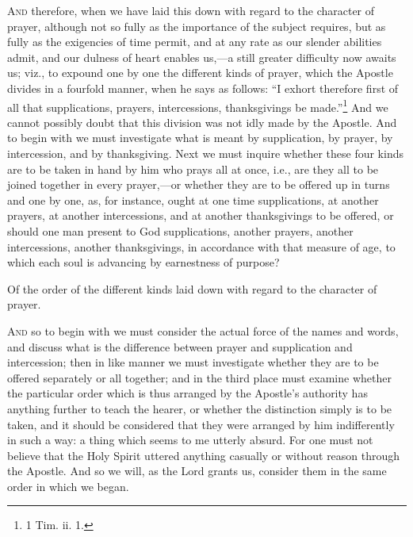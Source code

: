 \textsc{And} therefore, when we have laid this down with regard to the character of prayer, although not so fully as the importance of the subject requires, but as fully as the exigencies of time permit, and at any rate as our slender abilities admit, and our dulness of heart enables us,—a still greater difficulty now awaits us; viz., to expound one by one the different kinds of prayer, which the Apostle divides in a fourfold manner, when he says as follows: “I exhort therefore first of all that supplications, prayers, intercessions, thanksgivings be made.”\footnote{1 Tim. ii. 1.} And we cannot possibly doubt that this division was not idly made by the Apostle. And to begin with we must investigate what is meant by supplication, by prayer, by intercession, and by thanksgiving. Next we must inquire whether these four kinds are to be taken in hand by him who prays all at once, i.e., are they all to be joined together in every prayer,—or whether they are to be offered up in turns and one by one, as, for instance, ought at one time supplications, at another prayers, at another intercessions, and at another thanksgivings to be offered, or should one man present to God supplications, another prayers, another intercessions, another thanksgivings, in accordance with that measure of age, to which each soul is advancing by earnestness of purpose?


Of the order of the different kinds laid down with regard to the character of prayer.

\textsc{And} so to begin with we must consider the actual force of the names and words, and discuss what is the difference between prayer and supplication and intercession; then in like manner we must investigate whether they are to be offered separately or all together; and in the third place must examine whether the particular order which is thus arranged by the Apostle’s authority has anything further to teach the hearer, or whether the distinction simply is to be taken, and it should be considered that they were arranged by him indifferently in such a way: a thing which seems to me utterly absurd. For one must not believe that the Holy Spirit uttered anything casually or without reason through the Apostle. And so we will, as the Lord grants us, consider them in the same order in which we began.


